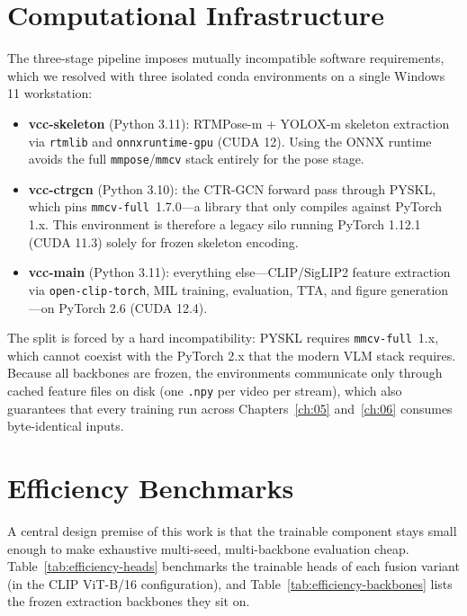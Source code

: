 \section{Computational Infrastructure}
\label{sec:infra}

The three-stage pipeline imposes mutually incompatible software requirements,
which we resolved with three isolated conda environments on a single Windows
11 workstation:

\begin{itemize}
    \item \textbf{vcc-skeleton} (Python 3.11): RTMPose-m + YOLOX-m skeleton
    extraction via \texttt{rtmlib} and \texttt{onnxruntime-gpu} (CUDA 12).
    Using the ONNX runtime avoids the full \texttt{mmpose}/\texttt{mmcv}
    stack entirely for the pose stage.
    \item \textbf{vcc-ctrgcn} (Python 3.10): the CTR-GCN forward pass through
    PYSKL, which pins \texttt{mmcv-full}~1.7.0---a library that only compiles
    against PyTorch 1.x. This environment is therefore a legacy silo running
    PyTorch 1.12.1 (CUDA 11.3) solely for frozen skeleton encoding.
    \item \textbf{vcc-main} (Python 3.11): everything else---CLIP/SigLIP2
    feature extraction via \texttt{open-clip-torch}, MIL training, evaluation,
    TTA, and figure generation---on PyTorch 2.6 (CUDA 12.4).
\end{itemize}

The split is forced by a hard incompatibility: PYSKL requires
\texttt{mmcv-full}~1.x, which cannot coexist with the PyTorch 2.x that the
modern VLM stack requires. Because all backbones are frozen, the environments
communicate only through cached feature files on disk (one \texttt{.npy} per
video per stream), which also guarantees that every training run across
Chapters~\ref{ch:05} and~\ref{ch:06} consumes byte-identical inputs.

\section{Efficiency Benchmarks}
\label{sec:efficiency}

A central design premise of this work is that the trainable component stays
small enough to make exhaustive multi-seed, multi-backbone evaluation cheap.
Table~\ref{tab:efficiency-heads} benchmarks the trainable heads of each fusion
variant (in the CLIP ViT-B/16 configuration), and
Table~\ref{tab:efficiency-backbones} lists the frozen extraction backbones
they sit on.


